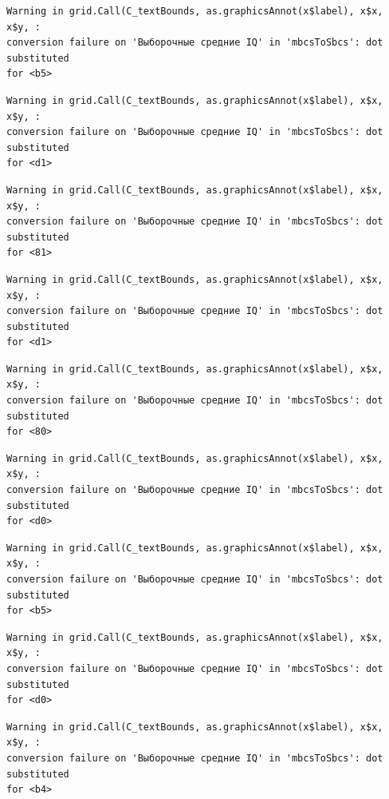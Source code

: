\documentclass[
  letterpaper,
  DIV=11,
  numbers=noendperiod]{scrreprt}
\theoremstyle{definition}
\theoremstyle{remark}
\begin{document}
\begin{verbatim}
Warning in grid.Call(C_textBounds, as.graphicsAnnot(x$label), x$x, x$y, :
conversion failure on 'Выборочные средние IQ' in 'mbcsToSbcs': dot substituted
for <b5>
\end{verbatim}

\begin{verbatim}
Warning in grid.Call(C_textBounds, as.graphicsAnnot(x$label), x$x, x$y, :
conversion failure on 'Выборочные средние IQ' in 'mbcsToSbcs': dot substituted
for <d1>
\end{verbatim}

\begin{verbatim}
Warning in grid.Call(C_textBounds, as.graphicsAnnot(x$label), x$x, x$y, :
conversion failure on 'Выборочные средние IQ' in 'mbcsToSbcs': dot substituted
for <81>
\end{verbatim}

\begin{verbatim}
Warning in grid.Call(C_textBounds, as.graphicsAnnot(x$label), x$x, x$y, :
conversion failure on 'Выборочные средние IQ' in 'mbcsToSbcs': dot substituted
for <d1>
\end{verbatim}

\begin{verbatim}
Warning in grid.Call(C_textBounds, as.graphicsAnnot(x$label), x$x, x$y, :
conversion failure on 'Выборочные средние IQ' in 'mbcsToSbcs': dot substituted
for <80>
\end{verbatim}

\begin{verbatim}
Warning in grid.Call(C_textBounds, as.graphicsAnnot(x$label), x$x, x$y, :
conversion failure on 'Выборочные средние IQ' in 'mbcsToSbcs': dot substituted
for <d0>
\end{verbatim}

\begin{verbatim}
Warning in grid.Call(C_textBounds, as.graphicsAnnot(x$label), x$x, x$y, :
conversion failure on 'Выборочные средние IQ' in 'mbcsToSbcs': dot substituted
for <b5>
\end{verbatim}

\begin{verbatim}
Warning in grid.Call(C_textBounds, as.graphicsAnnot(x$label), x$x, x$y, :
conversion failure on 'Выборочные средние IQ' in 'mbcsToSbcs': dot substituted
for <d0>
\end{verbatim}

\begin{verbatim}
Warning in grid.Call(C_textBounds, as.graphicsAnnot(x$label), x$x, x$y, :
conversion failure on 'Выборочные средние IQ' in 'mbcsToSbcs': dot substituted
for <b4>
\end{verbatim}
\end{document}
